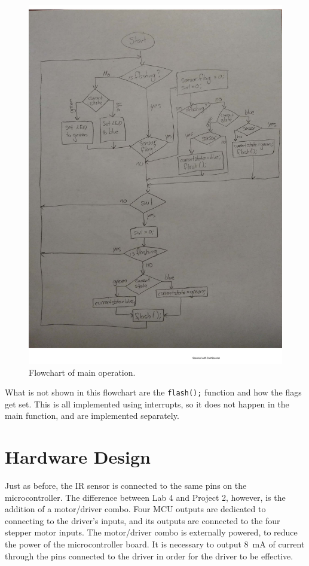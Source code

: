 \documentclass{article}
\renewcommand{\c}[1]{\texttt{#1}}
\begin{document}
\begin{figure}[H]
    \centering
    \includegraphics[width=\textwidth]{Images/flowchart}
    \caption{Flowchart of main operation.}
    \label{fig:flowchart}
\end{figure}

What is not shown in this flowchart are the \c{flash();}
function and how the flags get set. This is all implemented
using interrupts, so it does not happen in the main function,
and are implemented separately.

\section{Hardware Design} Just as before, the IR sensor is
connected to the same pins on the microcontroller. The difference
between Lab 4 and Project 2, however, is the addition of a
motor/driver combo. Four MCU outputs are dedicated to connecting
to the driver's inputs, and its outputs are connected to the
four stepper motor inputs. The motor/driver combo is externally
powered, to reduce the power of the microcontroller board.
It is necessary to output \SI{8}{\milli\ampere} of current
through the pins connected to the driver in order for the
driver to be effective.
\end{document}
